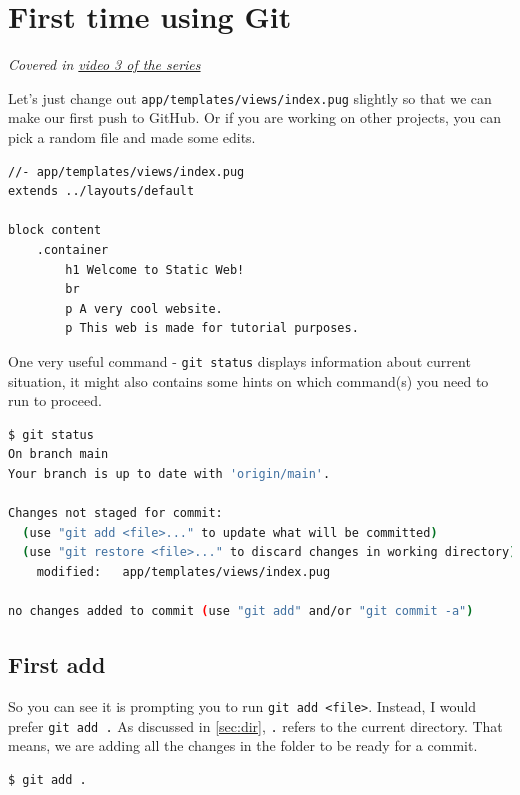 \section{First time using Git}
\label{sec:gitfirst}

\textit{Covered in \href{https://www.youtube.com/watch?v=wQmFz-Ggxuo&list=PLjGmdnqrOKuYXiu7lgG5HW71jPEUd1XCm&index=4}{video 3 of the series}}
\vspace{6mm}

Let's just change out \texttt{app/templates/views/index.pug} slightly so that we can make our first push to GitHub. Or if you are working on other projects, you can pick a random file and made some edits.

\begin{lstlisting}[language=pug]
//- app/templates/views/index.pug
extends ../layouts/default

block content
	.container
		h1 Welcome to Static Web!
		br
		p A very cool website.
		p This web is made for tutorial purposes.
\end{lstlisting}

One very useful command - \texttt{git status} displays information about current situation, it might also contains some hints on which command(s) you need to run to proceed.

\begin{lstlisting}[language=bash]
$ git status
On branch main
Your branch is up to date with 'origin/main'.

Changes not staged for commit:
  (use "git add <file>..." to update what will be committed)
  (use "git restore <file>..." to discard changes in working directory)
	modified:   app/templates/views/index.pug

no changes added to commit (use "git add" and/or "git commit -a")
\end{lstlisting}

\subsection*{First add}
So you can see it is prompting you to run \texttt{git add <file>}. Instead, I would prefer \texttt{git add .} As discussed in \cref{sec:dir}, \texttt{.} refers to the current directory. That means, we are adding all the changes in the folder to be ready for a commit.

\begin{lstlisting}[language=bash]
$ git add .
\end{lstlisting}


